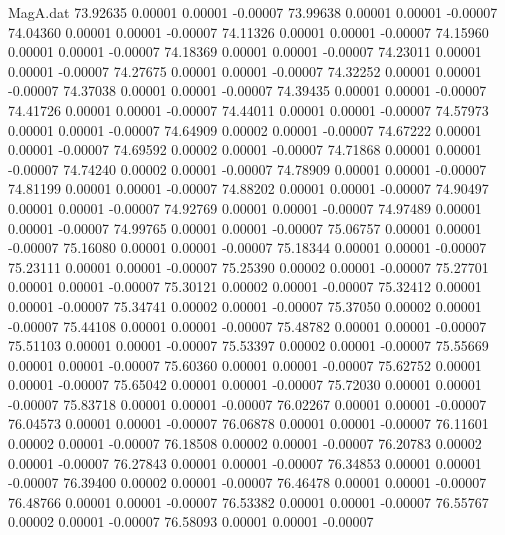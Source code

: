 \begin{filecontents}{MagA.dat}
  73.92635    0.00001    0.00001   -0.00007
  73.99638    0.00001    0.00001   -0.00007
  74.04360    0.00001    0.00001   -0.00007
  74.11326    0.00001    0.00001   -0.00007
  74.15960    0.00001    0.00001   -0.00007
  74.18369    0.00001    0.00001   -0.00007
  74.23011    0.00001    0.00001   -0.00007
  74.27675    0.00001    0.00001   -0.00007
  74.32252    0.00001    0.00001   -0.00007
  74.37038    0.00001    0.00001   -0.00007
  74.39435    0.00001    0.00001   -0.00007
  74.41726    0.00001    0.00001   -0.00007
  74.44011    0.00001    0.00001   -0.00007
  74.57973    0.00001    0.00001   -0.00007
  74.64909    0.00002    0.00001   -0.00007
  74.67222    0.00001    0.00001   -0.00007
  74.69592    0.00002    0.00001   -0.00007
  74.71868    0.00001    0.00001   -0.00007
  74.74240    0.00002    0.00001   -0.00007
  74.78909    0.00001    0.00001   -0.00007
  74.81199    0.00001    0.00001   -0.00007
  74.88202    0.00001    0.00001   -0.00007
  74.90497    0.00001    0.00001   -0.00007
  74.92769    0.00001    0.00001   -0.00007
  74.97489    0.00001    0.00001   -0.00007
  74.99765    0.00001    0.00001   -0.00007
  75.06757    0.00001    0.00001   -0.00007
  75.16080    0.00001    0.00001   -0.00007
  75.18344    0.00001    0.00001   -0.00007
  75.23111    0.00001    0.00001   -0.00007
  75.25390    0.00002    0.00001   -0.00007
  75.27701    0.00001    0.00001   -0.00007
  75.30121    0.00002    0.00001   -0.00007
  75.32412    0.00001    0.00001   -0.00007
  75.34741    0.00002    0.00001   -0.00007
  75.37050    0.00002    0.00001   -0.00007
  75.44108    0.00001    0.00001   -0.00007
  75.48782    0.00001    0.00001   -0.00007
  75.51103    0.00001    0.00001   -0.00007
  75.53397    0.00002    0.00001   -0.00007
  75.55669    0.00001    0.00001   -0.00007
  75.60360    0.00001    0.00001   -0.00007
  75.62752    0.00001    0.00001   -0.00007
  75.65042    0.00001    0.00001   -0.00007
  75.72030    0.00001    0.00001   -0.00007
  75.83718    0.00001    0.00001   -0.00007
  76.02267    0.00001    0.00001   -0.00007
  76.04573    0.00001    0.00001   -0.00007
  76.06878    0.00001    0.00001   -0.00007
  76.11601    0.00002    0.00001   -0.00007
  76.18508    0.00002    0.00001   -0.00007
  76.20783    0.00002    0.00001   -0.00007
  76.27843    0.00001    0.00001   -0.00007
  76.34853    0.00001    0.00001   -0.00007
  76.39400    0.00002    0.00001   -0.00007
  76.46478    0.00001    0.00001   -0.00007
  76.48766    0.00001    0.00001   -0.00007
  76.53382    0.00001    0.00001   -0.00007
  76.55767    0.00002    0.00001   -0.00007
  76.58093    0.00001    0.00001   -0.00007

\end{filecontents}
